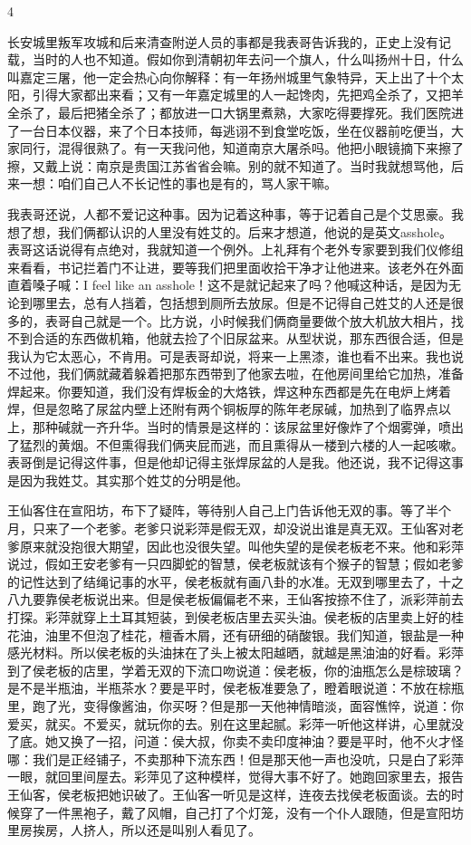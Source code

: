 4 

长安城里叛军攻城和后来清查附逆人员的事都是我表哥告诉我的，正史上没有记载，当时的人也不知道。假如你到清朝初年去问一个旗人，什么叫扬州十日，什么叫嘉定三屠，他一定会热心向你解释：有一年扬州城里气象特异，天上出了十个太阳，引得大家都出来看；又有一年嘉定城里的人一起馋肉，先把鸡全杀了，又把羊全杀了，最后把猪全杀了；都放进一口大锅里煮熟，大家吃得要撑死。我们医院进了一台日本仪器，来了个日本技师，每逃诩不到食堂吃饭，坐在仪器前吃便当，大家同行，混得很熟了。有一天我问他，知道南京大屠杀吗。他把小眼镜摘下来擦了擦，又戴上说：南京是贵国江苏省省会嘛。别的就不知道了。当时我就想骂他，后来一想：咱们自己人不长记性的事也是有的，骂人家干嘛。 

我表哥还说，人都不爱记这种事。因为记着这种事，等于记着自己是个艾思豪。我想了想，我们俩都认识的人里没有姓艾的。后来才想道，他说的是英文asshole。表哥这话说得有点绝对，我就知道一个例外。上礼拜有个老外专家要到我们仪修组来看看，书记拦着门不让进，要等我们把里面收拾干净才让他进来。该老外在外面直着嗓子喊：I feel like an asshole！这不是就记起来了吗？他喊这种话，是因为无论到哪里去，总有人挡着，包括想到厕所去放尿。但是不记得自己姓艾的人还是很多的，表哥自己就是一个。比方说，小时候我们俩商量要做个放大机放大相片，找不到合适的东西做机箱，他就去捡了个旧尿盆来。从型状说，那东西很合适，但是我认为它太恶心，不肯用。可是表哥却说，将来一上黑漆，谁也看不出来。我也说不过他，我们俩就藏着躲着把那东西带到了他家去啦，在他房间里给它加热，准备焊起来。你要知道，我们没有焊板金的大烙铁，焊这种东西都是先在电炉上烤着焊，但是忽略了尿盆内壁上还附有两个铜板厚的陈年老尿碱，加热到了临界点以上，那种碱就一齐升华。当时的情景是这样的：该尿盆里好像炸了个烟雾弹，喷出了猛烈的黄烟。不但熏得我们俩夹屁而逃，而且熏得从一楼到六楼的人一起咳嗽。表哥倒是记得这件事，但是他却记得主张焊尿盆的人是我。他还说，我不记得这事是因为我姓艾。其实那个姓艾的分明是他。 

王仙客住在宣阳坊，布下了疑阵，等待别人自己上门告诉他无双的事。等了半个月，只来了一个老爹。老爹只说彩萍是假无双，却没说出谁是真无双。王仙客对老爹原来就没抱很大期望，因此也没很失望。叫他失望的是侯老板老不来。他和彩萍说过，假如王安老爹有一只四脚蛇的智慧，侯老板就该有个猴子的智慧；假如老爹的记性达到了结绳记事的水平，侯老板就有画八卦的水准。无双到哪里去了，十之八九要靠侯老板说出来。但是侯老板偏偏老不来，王仙客按捺不住了，派彩萍前去打探。彩萍就穿上土耳其短装，到侯老板店里去买头油。侯老板的店里卖上好的桂花油，油里不但泡了桂花，檀香木屑，还有研细的硝酸银。我们知道，银盐是一种感光材料。所以侯老板的头油抹在了头上被太阳越晒，就越是黑油油的好看。彩萍到了侯老板的店里，学着无双的下流口吻说道：侯老板，你的油瓶怎么是棕玻璃？是不是半瓶油，半瓶茶水？要是平时，侯老板准要急了，瞪着眼说道：不放在棕瓶里，跑了光，变得像酱油，你买呀？但是那一天他神情暗淡，面容憔悴，说道：你爱买，就买。不爱买，就玩你的去。别在这里起腻。彩萍一听他这样讲，心里就没了底。她又换了一招，问道：侯大叔，你卖不卖印度神油？要是平时，他不火才怪哪：我们是正经铺子，不卖那种下流东西！但是那天他一声也没吭，只是白了彩萍一眼，就回里间屋去。彩萍见了这种模样，觉得大事不好了。她跑回家里去，报告王仙客，侯老板把她识破了。王仙客一听见是这样，连夜去找侯老板面谈。去的时候穿了一件黑袍子，戴了风帽，自己打了个灯笼，没有一个仆人跟随，但是宣阳坊里房挨房，人挤人，所以还是叫别人看见了。 

